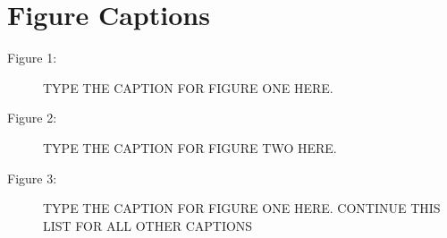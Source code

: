 \documentclass[preprint,5p]{elsarticle}
\begin{document}


\pagebreak

\section*{Figure Captions}

\begin{description}
\item[Figure 1:]  TYPE THE CAPTION FOR FIGURE ONE HERE.
\item[Figure 2:]  TYPE THE CAPTION FOR FIGURE TWO HERE.
\item[Figure 3:]  TYPE THE CAPTION FOR FIGURE ONE HERE.  CONTINUE THIS LIST FOR ALL OTHER CAPTIONS
\end{description}





\pagebreak




\pagebreak
\end{document}
